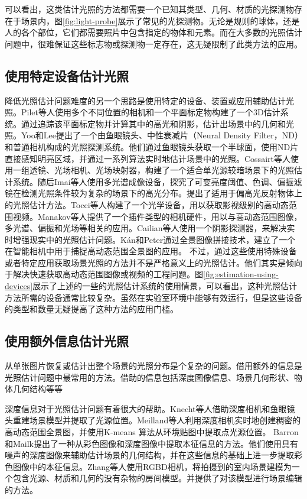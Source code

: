 可以看出，这类估计光照的方法都需要一个已知其类型、几何、材质的光探测物存在于场景内，图\ref{fig:light-probe}展示了常见的光探测物。无论是规则的球体，还是人的各个部位，它们都需要照片中包含指定的物体和元素。而在大多数的光照估计问题中，很难保证这些标志物或探测物一定存在，这无疑限制了此类方法的应用。

\subsection{使用特定设备估计光照}

降低光照估计问题难度的另一个思路是使用特定的设备、装置或应用辅助估计光照。Pilet等人\cite{pilet2006all}使用多个不同位置的相机和一个平面标定物构建了一个3D估计系统。通过追踪该平面标定物并计算其中的高光和阴影，估计出场景中的几何和光照。Yoo和Lee\cite{yoo2008real}提出了一个由鱼眼镜头、中性衰减片（Neural Density Filter，ND）和普通相机构成的光照探测系统。他们通过鱼眼镜头获取一个半球面，使用ND片直接感知明亮区域，并通过一系列算法实时地估计场景中的光照。Cossairt等人\cite{cossairt2008light}使用一组透镜、光场相机、光场映射器，构建了一个适合单光源较暗场景下的光照估计系统。随后Imai等人\cite{imai2011estimation}使用多光谱成像设备，探究了可变亮度阈值、色调、偏振滤镜在检测光照条件较为复杂的场景下的高光分布。提出了适用于偏高光反射物体上的光照估计方法。Tocci等人\cite{tocci2011versatile}构建了一个光学设备，用以获取影视级别的高动态范围视频。Manakov等人\cite{manakov2013reconfigurable}提供了一个插件类型的相机硬件，用以与高动态范围图像，多光谱、偏振和光场等相关的应用。Cailian等人\cite{calian2013shading}使用一个阴影探测器，来解决实时增强现实中的光照估计问题。K\'an和Peter\cite{kan2015interactive}通过全景图像拼接技术，建立了一个在智能相机中用于捕捉高动态范围全景图的应用。
不过，通过这些使用特殊设备或者特定应用获取场景光照的方法并不是严格意义上的光照估计。他们其实是倾向于解决快速获取高动态范围图像或视频的工程问题。图\ref{fig:estimation-using-devices}展示了上述的一些的光照估计系统的使用情景，可以看出，这种光照估计方法所需的设备通常比较复杂。虽然在实验室环境中能够有效运行，但是这些设备的类型和数量无疑提高了这种方法的应用门槛。

\subsection{使用额外信息估计光照}
从单张图片恢复或估计出整个场景的光照分布是个复杂的问题。借用额外的信息是光照估计问题中最常用的方法。借助的信息包括深度图像信息、场景几何形状、物体几何结构等等

深度信息对于光照估计问题有着很大的帮助。Knecht等人\cite{knecht2012reciprocal}借助深度相机和鱼眼镜头重建场景模型并提取了光源位置。Meilland等人\cite{meilland20133d}利用深度相机实时地创建稠密的高动态范围全景图，并使用K-means 算法从环境贴图中提取点光源位置。 Barron和Mailk\cite{barron2013intrinsic}提出了一种从彩色图像和深度图像中提取本征信息的方法。他们使用具有噪声的深度图像来辅助估计场景的几何结构，并在这些信息的基础上进一步提取彩色图像中的本征信息。Zhang等人\cite{zhang2016emptying}使用RGBD相机，将拍摄到的室内场景建模为一个包含光源、材质和几何的没有杂物的房间模型。并提供了对该模型进行场景编辑的方法。


